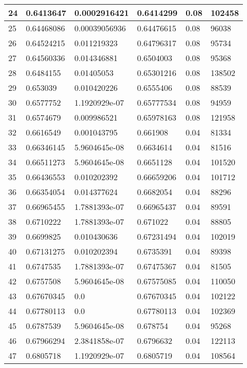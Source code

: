 \begin{longtable}{|l|l|l|l|l|l|}
24 & 0.6413647 & 0.0002916421 & 0.6414299 & 0.08 & 102458 \\ \hline 
25 & 0.64468086 & 0.00039056936 & 0.64476615 & 0.08 & 96038 \\ \hline 
26 & 0.64524215 & 0.011219323 & 0.64796317 & 0.08 & 95734 \\ \hline 
27 & 0.64560336 & 0.014346881 & 0.6504003 & 0.08 & 95368 \\ \hline 
28 & 0.6484155 & 0.01405053 & 0.65301216 & 0.08 & 138502 \\ \hline 
29 & 0.653039 & 0.010420226 & 0.6555406 & 0.08 & 88539 \\ \hline 
30 & 0.6577752 & 1.1920929e-07 & 0.65777534 & 0.08 & 94959 \\ \hline 
31 & 0.6574679 & 0.009986521 & 0.65978163 & 0.08 & 121958 \\ \hline 
32 & 0.6616549 & 0.001043795 & 0.661908 & 0.04 & 81334 \\ \hline 
33 & 0.66346145 & 5.9604645e-08 & 0.6634614 & 0.04 & 81516 \\ \hline 
34 & 0.66511273 & 5.9604645e-08 & 0.6651128 & 0.04 & 101520 \\ \hline 
35 & 0.66436553 & 0.010202392 & 0.66659206 & 0.04 & 101712 \\ \hline 
36 & 0.66354054 & 0.014377624 & 0.6682054 & 0.04 & 88296 \\ \hline 
37 & 0.66965455 & 1.7881393e-07 & 0.66965437 & 0.04 & 89591 \\ \hline 
38 & 0.6710222 & 1.7881393e-07 & 0.671022 & 0.04 & 88805 \\ \hline 
39 & 0.6699825 & 0.010430636 & 0.67231494 & 0.04 & 102019 \\ \hline 
40 & 0.67131275 & 0.010202394 & 0.6735391 & 0.04 & 89398 \\ \hline 
41 & 0.6747535 & 1.7881393e-07 & 0.67475367 & 0.04 & 81505 \\ \hline 
42 & 0.6757508 & 5.9604645e-08 & 0.67575085 & 0.04 & 110050 \\ \hline 
43 & 0.67670345 & 0.0 & 0.67670345 & 0.04 & 102122 \\ \hline 
44 & 0.67780113 & 0.0 & 0.67780113 & 0.04 & 102369 \\ \hline 
45 & 0.6787539 & 5.9604645e-08 & 0.678754 & 0.04 & 95268 \\ \hline 
46 & 0.67966294 & 2.3841858e-07 & 0.6796632 & 0.04 & 122113 \\ \hline 
47 & 0.6805718 & 1.1920929e-07 & 0.6805719 & 0.04 & 108564 \\ \hline 

\end{longtable}
